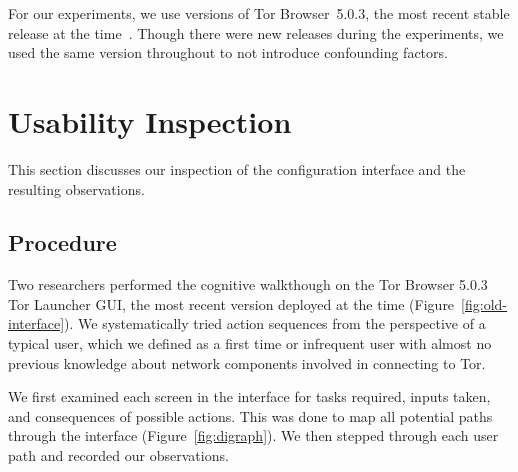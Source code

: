 \documentclass[USenglish,oneside,twocolumn]{article}
\begin{document}
For our experiments, we use versions of Tor Browser~5.0.3, 
the most recent stable release at the time~\cite{torbrowser-503}.
Though there were new releases during the experiments,
we used the same version throughout to not introduce
confounding factors.

\section{Usability Inspection}
This section discusses our inspection of the configuration interface and the resulting observations.

\subsection{Procedure} 
Two researchers performed the cognitive walkthough on the Tor Browser 5.0.3 Tor Launcher GUI, the most recent version deployed at the time (Figure~\ref{fig:old-interface}). We systematically tried action sequences from the perspective of a typical user, which we defined as a first time or infrequent user with almost no previous knowledge about network components involved in connecting to Tor.

We first examined each screen in the interface for tasks required, inputs taken, and consequences of possible actions. This was done to map all potential paths through the interface (Figure~\ref{fig:digraph}). We then stepped through each user path and recorded our observations. 
\end{document}
